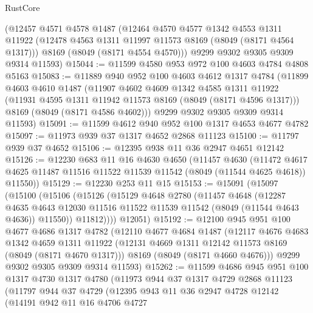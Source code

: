 \begin{lexlean}{RustCore}
\begin{coremodule}
    (@12457
      @4571
      @4578
      @1487
      (@12464
        @4570
        @4577
        @1342
        @4553
        @1311
        @11922
        (@12478 @4563 @1311 @11997 @11573 @8169 (@8049 (@8171 @4564 @1317)))
        @8169
        (@8049 (@8171 @4554 @4570)))
      @9299
      @9302
      @9305
      @9309
      @9314
      @11593)
@15044 := @11599 @4580 @953 @972 @100 @4603 @4784 @4808 @5163
@15083 := @11889
    @940
    @952
    @100
    @4603
    @4612
    @1317
    @4784
    (@11899
      @4603
      @4610
      @1487
      (@11907
        @4602
        @4609
        @1342
        @4585
        @1311
        @11922
        (@11931 @4595 @1311 @11942 @11573 @8169 (@8049 (@8171 @4596 @1317)))
        @8169
        (@8049 (@8171 @4586 @4602)))
      @9299
      @9302
      @9305
      @9309
      @9314
      @11593)
@15091 := @11599 @4612 @940 @952 @100 @1317 @4653 @4677 @4782
@15097 := @11973 @939 @37 @1317 @4652 @2868 @11123
@15100 := @11797 @939 @37 @4652
@15106 := @12395 @938 @11 @36 @2947 @4651 @12142
@15126 := @12230
    @683
    @11
    @16
    @4630
    @4650
    (@11457
      @4630
      (@11472 @4617 @4625 @11487 @11516 @11522 @11539 @11542 (@8049 (@11544 @4625 @4618)) @11550))
@15129 := @12230 @253 @11 @15
@15153 := @15091
    (@15097
      (@15100
        (@15106
          (@15126
            (@15129
              @4648
              @2780
              (@11457
                @4648
                (@12287
                  @4635
                  @4643
                  @12030
                  @11516
                  @11522
                  @11539
                  @11542
                  (@8049 (@11544 @4643 @4636))
                  @11550))
              @11812))))
      @12051)
@15192 := @12100
    @945
    @951
    @100
    @4677
    @4686
    @1317
    @4782
    (@12110
      @4677
      @4684
      @1487
      (@12117
        @4676
        @4683
        @1342
        @4659
        @1311
        @11922
        (@12131 @4669 @1311 @12142 @11573 @8169 (@8049 (@8171 @4670 @1317)))
        @8169
        (@8049 (@8171 @4660 @4676)))
      @9299
      @9302
      @9305
      @9309
      @9314
      @11593)
@15262 := @11599
    @4686
    @945
    @951
    @100
    @1317
    @4730
    @1317
    @4780
    (@11973
      @944
      @37
      @1317
      @4729
      @2868
      @11123
      (@11797
        @944
        @37
        @4729
        (@12395
          @943
          @11
          @36
          @2947
          @4728
          @12142
          (@14191
            @942
            @11
            @16
            @4706
            @4727

\end{coremodule}
\end{lexlean}

